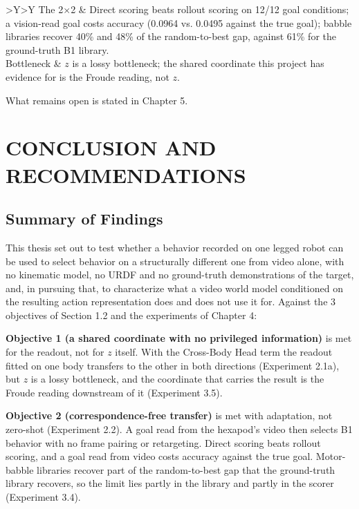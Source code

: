 \documentclass[12pt,a4paper,oneside]{report}
\begin{document}
\begin{center}
\begin{tabularx}{\textwidth}{>{\hsize}Y>{\hsize}Y}
 The 2$\times$2 & Direct scoring beats rollout scoring on 12/12 goal conditions; a vision-read goal costs accuracy (0.0964 vs. 0.0495 against the true goal); babble libraries recover 40\% and 48\% of the random-to-best gap, against 61\% for the ground-truth B1 library.\\
 Bottleneck & $z$ is a lossy bottleneck; the shared coordinate this project has evidence for is the Froude reading, not $z$.\\
\bottomrule
\end{tabularx}
\end{center}

What remains open is stated in Chapter 5.

\chapter{CONCLUSION AND RECOMMENDATIONS}

\section{Summary of Findings}
This thesis set out to test whether a behavior recorded on one legged robot can be used to select behavior on a
structurally different one from video alone, with no kinematic model, no URDF and no ground-truth demonstrations of the
target, and, in pursuing that, to characterize what a video world model conditioned on the resulting action
representation does and does not use it for. Against the 3 objectives of Section 1.2 and the experiments of
Chapter 4:

\noindent\textbf{Objective 1 (a shared coordinate with no privileged information)} is met for the readout, not for
$z$ itself. With the Cross-Body Head term the readout fitted on one body transfers to the other in both directions
(Experiment 2.1a), but $z$ is a lossy bottleneck, and the coordinate that carries the result is the Froude reading
downstream of it (Experiment 3.5).

\noindent\textbf{Objective 2 (correspondence-free transfer)} is met with adaptation, not zero-shot (Experiment 2.2).
A goal read from the hexapod's video then selects B1 behavior with no frame pairing or retargeting. Direct scoring
beats rollout scoring, and a goal read from video costs accuracy against the true goal. Motor-babble libraries
recover part of the random-to-best gap that the ground-truth library recovers, so the limit lies partly in the library
and partly in the scorer (Experiment 3.4).
\end{document}
